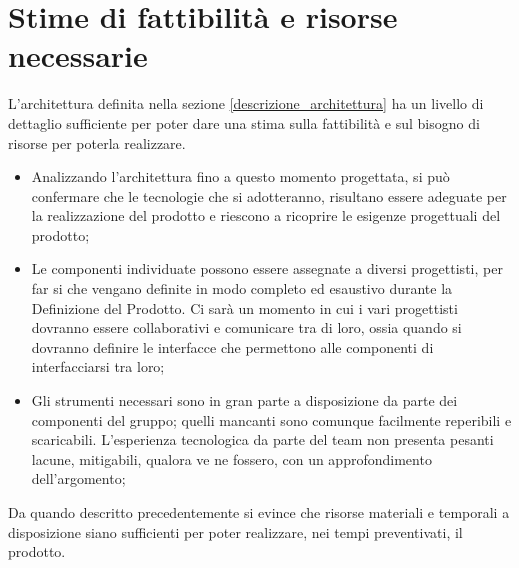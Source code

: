 \section{Stime di fattibilità e risorse necessarie}
\label{Stime}
L'architettura definita nella sezione \ref{descrizione_architettura} ha un livello di dettaglio sufficiente per poter dare una stima sulla fattibilità e sul bisogno di risorse per poterla realizzare.
\begin{itemize}
\item Analizzando l'architettura fino a questo momento progettata, si può confermare che le tecnologie che si adotteranno, risultano essere adeguate per la realizzazione del prodotto e riescono a ricoprire le esigenze progettuali del prodotto;
\item Le componenti individuate possono essere assegnate a diversi progettisti, per far si che vengano definite in modo completo ed esaustivo durante la Definizione del Prodotto. Ci sarà un momento in cui i vari progettisti dovranno essere collaborativi e comunicare tra di loro, ossia quando si dovranno definire le interfacce che permettono alle componenti di interfacciarsi tra loro;
\item Gli strumenti necessari sono in gran parte a disposizione da parte dei componenti del gruppo; quelli mancanti sono comunque facilmente reperibili e scaricabili. L'esperienza tecnologica da parte del team \authorName{} non presenta pesanti lacune, mitigabili, qualora ve ne fossero, con un approfondimento dell'argomento;
\end{itemize}
Da quando descritto precedentemente si evince che risorse materiali e temporali a disposizione siano sufficienti per poter realizzare, nei tempi preventivati, il prodotto.